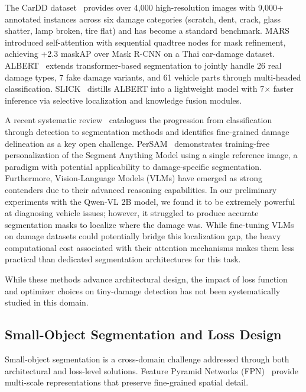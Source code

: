 \documentclass[10pt,twocolumn]{article}
\begin{document}
The CarDD dataset~\cite{wang2023cardd} provides over 4,000 high-resolution images with 9,000+ annotated instances across six damage categories (scratch, dent, crack, glass shatter, lamp broken, tire flat) and has become a standard benchmark. MARS~\cite{panboonyuen2023mars} introduced self-attention with sequential quadtree nodes for mask refinement, achieving +2.3 maskAP over Mask R-CNN on a Thai car-damage dataset. ALBERT~\cite{panboonyuen2025albert} extends transformer-based segmentation to jointly handle 26 real damage types, 7 fake damage variants, and 61 vehicle parts through multi-headed classification. SLICK~\cite{panboonyuen2025slick} distills ALBERT into a lightweight model with 7$\times$ faster inference via selective localization and knowledge fusion modules.

A recent systematic review~\cite{hasan2025survey} catalogues the progression from classification through detection to segmentation methods and identifies fine-grained damage delineation as a key open challenge. PerSAM~\cite{zhang2023persam} demonstrates training-free personalization of the Segment Anything Model using a single reference image, a paradigm with potential applicability to damage-specific segmentation. Furthermore, Vision-Language Models (VLMs) have emerged as strong contenders due to their advanced reasoning capabilities. In our preliminary experiments with the Qwen-VL 2B model, we found it to be extremely powerful at diagnosing vehicle issues; however, it struggled to produce accurate segmentation masks to localize where the damage was. While fine-tuning VLMs on damage datasets could potentially bridge this localization gap, the heavy computational cost associated with their attention mechanisms makes them less practical than dedicated segmentation architectures for this task.

While these methods advance architectural design, the impact of loss function and optimizer choices on tiny-damage detection has not been systematically studied in this domain.

\subsection{Small-Object Segmentation and Loss Design}

Small-object segmentation is a cross-domain challenge addressed through both architectural and loss-level solutions. Feature Pyramid Networks (FPN)~\cite{lin2017fpn} provide multi-scale representations that preserve fine-grained spatial detail.
\end{document}
